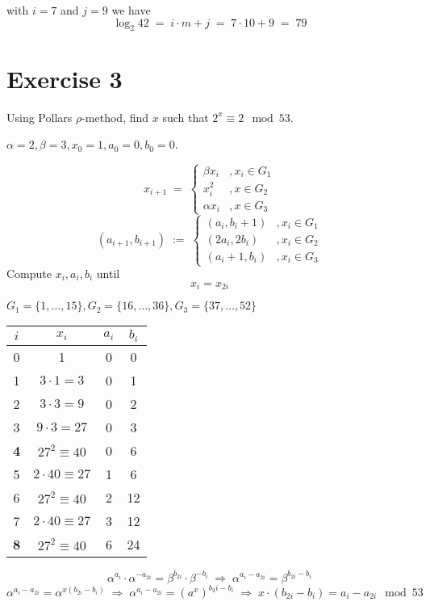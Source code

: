 \documentclass[a4paper]{scrreprt}
\begin{document}
with $i=7$ and $j=9$ we have
\[\log_2 42\;=\;i\cdot m+j\;=\;7\cdot 10+9\;=\;79\]

\section*{Exercise 3}

Using Pollars $\rho$-method, find $x$ such that $2^x\equiv 2\mod 53$.

$\alpha=2, \beta=3, x_0=1, a_0=0, b_0=0$.

\[x_{i+1} \;=\; \left\{\begin{array}{ll}
        \beta x_i & ,x_i\in G_1\\
        x_i^2 & ,x\in G_2\\
        \alpha x_i & ,x\in G_3
    \end{array}\right.\]
\[(a_{i+1}, b_{i+1}) \;:=\;\left\{\begin{array}{ll}
        (a_i, b_i+1) & ,x_i\in G_1\\
        (2a_i, 2b_i) & ,x_i\in G_2\\
        (a_i+1, b_i) & ,x_i\in G_3
    \end{array}\right.\]
Compute $x_i, a_i, b_i$ until \[x_i=x_{2i}\]

$G_1=\{1,\hdots,15\}, G_2=\{16,\hdots,36\}, G_3=\{37,\hdots,52\}$

\begin{center}
    \begin{tabular}{cccc}
        $i$ & $x_i$ & $a_i$ & $b_i$ \\
        \hline
        0 & 1 & 0 & 0 \\
        1 & $3\cdot 1=3$ & 0 & 1\\
        2 & $3\cdot 3=9$ & 0 & 2\\
        3 & $9\cdot 3=27$ & 0 & 3\\
        \textbf4 & $27^2\equiv 40$ & 0 & 6\\
        5 & $2\cdot40\equiv27$ & 1 & 6\\
        6 & $27^2\equiv40$ & 2 & 12\\
        7 & $2\cdot40\equiv27$ & 3 & 12\\
        \textbf8 & $27^2\equiv40$ & 6 & 24\\
    \end{tabular}
\end{center}

\[\alpha^{a_i}\cdot\alpha^{-a_{2i}} = \beta^{b_{2i}}\cdot\beta^{-b_i}
    \;\Rightarrow\; \alpha^{a_i-a_{2i}} = \beta^{b_{2i}-b_i}\]
    \[\alpha^{a_i-a_{2i}} = \alpha^{x(b_{2i}-b_i)}
    \;\Rightarrow\; \alpha^{a_i-a_{2i}}=(a^x)^{b_2i-b_i} \;\Rightarrow\;
x\cdot(b_{2i}-b_i)=a_i-a_{2i}\mod 53\]
\end{document}
